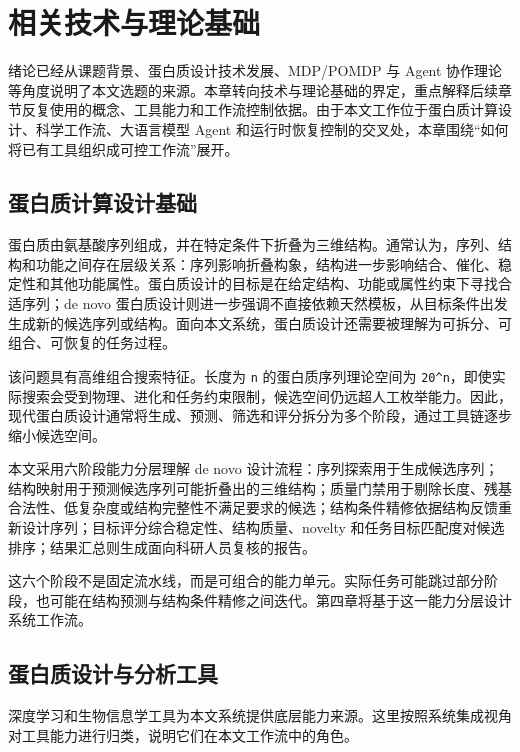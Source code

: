 \section{相关技术与理论基础}\label{ux76f8ux5173ux6280ux672fux4e0eux7406ux8bbaux57faux7840}

绪论已经从课题背景、蛋白质设计技术发展、MDP/POMDP 与 Agent
协作理论等角度说明了本文选题的来源。本章转向技术与理论基础的界定，重点解释后续章节反复使用的概念、工具能力和工作流控制依据。由于本文工作位于蛋白质计算设计、科学工作流、大语言模型
Agent
和运行时恢复控制的交叉处，本章围绕``如何将已有工具组织成可控工作流''展开。

\subsection{蛋白质计算设计基础}\label{ux86cbux767dux8d28ux8ba1ux7b97ux8bbeux8ba1ux57faux7840}

蛋白质由氨基酸序列组成，并在特定条件下折叠为三维结构。通常认为，序列、结构和功能之间存在层级关系：序列影响折叠构象，结构进一步影响结合、催化、稳定性和其他功能属性。蛋白质设计的目标是在给定结构、功能或属性约束下寻找合适序列；de
novo
蛋白质设计则进一步强调不直接依赖天然模板，从目标条件出发生成新的候选序列或结构。面向本文系统，蛋白质设计还需要被理解为可拆分、可组合、可恢复的任务过程。

该问题具有高维组合搜索特征。长度为 \texttt{n} 的蛋白质序列理论空间为
\texttt{20\^{}n}，即使实际搜索会受到物理、进化和任务约束限制，候选空间仍远超人工枚举能力。因此，现代蛋白质设计通常将生成、预测、筛选和评分拆分为多个阶段，通过工具链逐步缩小候选空间。

本文采用六阶段能力分层理解 de novo
设计流程：序列探索用于生成候选序列；结构映射用于预测候选序列可能折叠出的三维结构；质量门禁用于剔除长度、残基合法性、低复杂度或结构完整性不满足要求的候选；结构条件精修依据结构反馈重新设计序列；目标评分综合稳定性、结构质量、novelty
和任务目标匹配度对候选排序；结果汇总则生成面向科研人员复核的报告。

这六个阶段不是固定流水线，而是可组合的能力单元。实际任务可能跳过部分阶段，也可能在结构预测与结构条件精修之间迭代。第四章将基于这一能力分层设计系统工作流。

\subsection{蛋白质设计与分析工具}\label{ux86cbux767dux8d28ux8bbeux8ba1ux4e0eux5206ux6790ux5de5ux5177}

深度学习和生物信息学工具为本文系统提供底层能力来源。这里按照系统集成视角对工具能力进行归类，说明它们在本文工作流中的角色。

